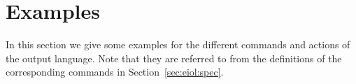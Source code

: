 \section{Examples}
\label{sec:eiol:examples}

In this section we give some examples for the different commands and
actions of the \ei output language. Note that they are referred to
from the definitions of the corresponding commands in
Section~\ref{sec:eiol:spec}.


